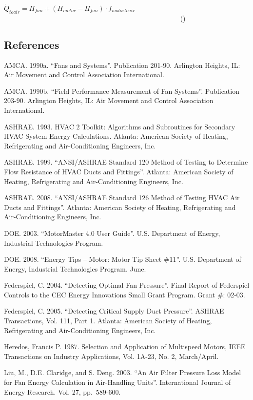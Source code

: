 \({\dot Q_{toair}} = {H_{fan}} + \left( {{H_{motor}} - {H_{fan}}} \right) \cdot {f_{motortoair}}\) ~~~~~~~~~~~~~~~~~~~~~~~~~~~~~~~~~~~~~~~~~~~~~~~~~~~ ()

\subsection{References}\label{references-002}

AMCA. 1990a. ``Fans and Systems''. Publication 201-90. Arlington Heights, IL: Air Movement and Control Association International.

AMCA. 1990b. ``Field Performance Measurement of Fan Systems''. Publication 203-90. Arlington Heights, IL: Air Movement and Control Association International.

ASHRAE. 1993. HVAC 2 Toolkit: Algorithms and Subroutines for Secondary HVAC System Energy Calculations. Atlanta: American Society of Heating, Refrigerating and Air-Conditioning Engineers, Inc.

ASHRAE. 1999. ``ANSI/ASHRAE Standard 120 Method of Testing to Determine Flow Resistance of HVAC Ducts and Fittings''. Atlanta: American Society of Heating, Refrigerating and Air-Conditioning Engineers, Inc.

ASHRAE. 2008. ``ANSI/ASHRAE Standard 126 Method of Testing HVAC Air Ducts and Fittings''. Atlanta: American Society of Heating, Refrigerating and Air-Conditioning Engineers, Inc.

DOE. 2003. ``MotorMaster 4.0 User Guide''. U.S. Department of Energy, Industrial Technologies Program.

DOE. 2008. ``Energy Tips -- Motor: Motor Tip Sheet \#11''. U.S. Department of Energy, Industrial Technologies Program. June.

Federspiel, C. 2004. ``Detecting Optimal Fan Pressure''. Final Report of Federspiel Controls to the CEC Energy Innovations Small Grant Program. Grant \#: 02-03.

Federspiel, C. 2005. ``Detecting Critical Supply Duct Pressure''. ASHRAE Transactions, Vol. 111, Part 1. Atlanta: American Society of Heating, Refrigerating and Air-Conditioning Engineers, Inc.

Heredos, Francis P. 1987. Selection and Application of Multispeed Motors, IEEE Transactions on Industry Applications, Vol. 1A-23, No. 2, March/April.

Liu, M., D.E. Claridge, and S. Deng. 2003. ``An Air Filter Pressure Loss Model for Fan Energy Calculation in Air-Handling Units''. International Journal of Energy Research. Vol. 27, pp.~589-600.

